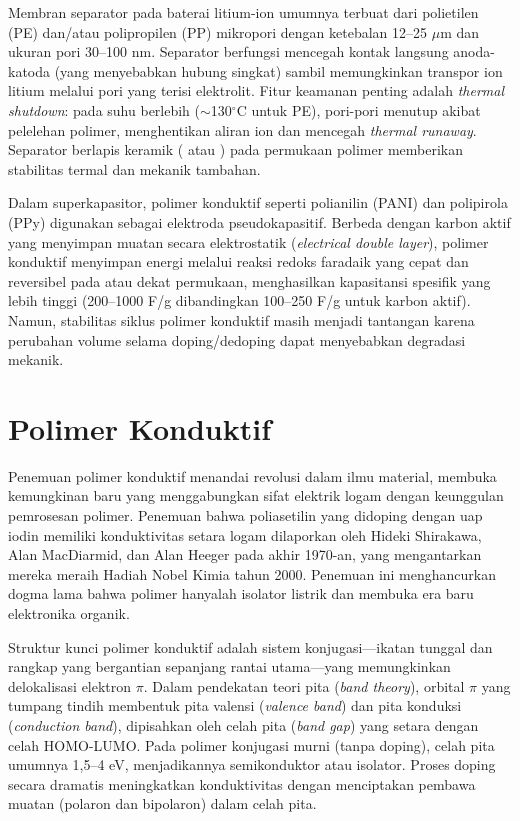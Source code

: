 \documentclass[12pt,a4paper,openany]{book}
\begin{document}
Membran separator pada baterai litium-ion umumnya terbuat dari polietilen (PE) dan/atau polipropilen (PP) mikropori dengan ketebalan 12--25 $\mu$m dan ukuran pori 30--100 nm. Separator berfungsi mencegah kontak langsung anoda-katoda (yang menyebabkan hubung singkat) sambil memungkinkan transpor ion litium melalui pori yang terisi elektrolit. Fitur keamanan penting adalah \textit{thermal shutdown}: pada suhu berlebih ($\sim$130$^{\circ}$C untuk PE), pori-pori menutup akibat pelelehan polimer, menghentikan aliran ion dan mencegah \textit{thermal runaway}. Separator berlapis keramik ( atau ) pada permukaan polimer memberikan stabilitas termal dan mekanik tambahan.

Dalam superkapasitor, polimer konduktif seperti polianilin (PANI) dan polipirola (PPy) digunakan sebagai elektroda pseudokapasitif. Berbeda dengan karbon aktif yang menyimpan muatan secara elektrostatik (\textit{electrical double layer}), polimer konduktif menyimpan energi melalui reaksi redoks faradaik yang cepat dan reversibel pada atau dekat permukaan, menghasilkan kapasitansi spesifik yang lebih tinggi (200--1000 F/g dibandingkan 100--250 F/g untuk karbon aktif). Namun, stabilitas siklus polimer konduktif masih menjadi tantangan karena perubahan volume selama doping/dedoping dapat menyebabkan degradasi mekanik.

\section{Polimer Konduktif}

Penemuan polimer konduktif menandai revolusi dalam ilmu material, membuka kemungkinan baru yang menggabungkan sifat elektrik logam dengan keunggulan pemrosesan polimer. Penemuan bahwa poliasetilin yang didoping dengan uap iodin memiliki konduktivitas setara logam dilaporkan oleh Hideki Shirakawa, Alan MacDiarmid, dan Alan Heeger pada akhir 1970-an, yang mengantarkan mereka meraih Hadiah Nobel Kimia tahun 2000. Penemuan ini menghancurkan dogma lama bahwa polimer hanyalah isolator listrik dan membuka era baru elektronika organik.

Struktur kunci polimer konduktif adalah sistem konjugasi---ikatan tunggal dan rangkap yang bergantian sepanjang rantai utama---yang memungkinkan delokalisasi elektron $\pi$. Dalam pendekatan teori pita (\textit{band theory}), orbital $\pi$ yang tumpang tindih membentuk pita valensi (\textit{valence band}) dan pita konduksi (\textit{conduction band}), dipisahkan oleh celah pita (\textit{band gap}) yang setara dengan celah HOMO-LUMO. Pada polimer konjugasi murni (tanpa doping), celah pita umumnya 1,5--4 eV, menjadikannya semikonduktor atau isolator. Proses doping secara dramatis meningkatkan konduktivitas dengan menciptakan pembawa muatan (polaron dan bipolaron) dalam celah pita.
\end{document}
